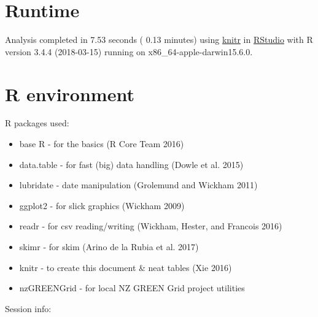\documentclass[]{article}
\providecommand{\tightlist}{%
  \setlength{\itemsep}{0pt}\setlength{\parskip}{0pt}}
\theoremstyle{definition}
\theoremstyle{definition}
\theoremstyle{definition}
\theoremstyle{remark}
\begin{document}
\section{Runtime}\label{runtime}

Analysis completed in 7.53 seconds ( 0.13 minutes) using
\href{https://cran.r-project.org/package=knitr}{knitr} in
\href{http://www.rstudio.com}{RStudio} with R version 3.4.4 (2018-03-15)
running on x86\_64-apple-darwin15.6.0.

\section{R environment}\label{r-environment}

R packages used:

\begin{itemize}
\tightlist
\item
  base R - for the basics (R Core Team 2016)
\item
  data.table - for fast (big) data handling (Dowle et al. 2015)
\item
  lubridate - date manipulation (Grolemund and Wickham 2011)
\item
  ggplot2 - for slick graphics (Wickham 2009)
\item
  readr - for csv reading/writing (Wickham, Hester, and Francois 2016)
\item
  skimr - for skim (Arino de la Rubia et al. 2017)
\item
  knitr - to create this document \& neat tables (Xie 2016)
\item
  nzGREENGrid - for local NZ GREEN Grid project utilities
\end{itemize}

Session info:
\end{document}
